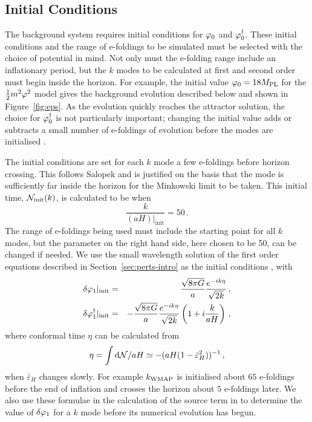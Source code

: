 \subsection{Initial Conditions} 
\label{sec:initconds-num}

The background system requires initial conditions for $\varphi_{0}$ and
$\varphi_{0}^{\dagger}$. These initial conditions and the range of
e-foldings to be simulated must be selected with the choice of
potential in mind. Not only must the
e-folding range include an inflationary period, but the $k$ modes to
be calculated at first and second order must begin inside the horizon. For example,
the initial value $\varphi_0 = 18M_{\mathrm{PL}}$ for the
$\frac{1}{2} m^2 \varphi^2$ model 
gives the background evolution described below and shown in Figure~\ref{fig:eps}. As
the evolution quickly reaches the attractor solution, the choice for $\varphi_0^{\dagger}$
is not particularly important; changing the initial value adds or subtracts a small
number of e-foldings of evolution before the modes are initialised
\cite{Ringeval:2007am, Martin:2006rs}.


The initial conditions are set for each $k$ mode a few e-foldings
before horizon crossing. This follows Salopek
\etal
\cite{Salopek:1988qh} and is justified on the basis that the mode is
sufficiently far inside the
horizon for the Minkowski limit to be taken. This initial time,
$\mathcal{N}_{\mathrm{init}}(k)$, is calculated to be when
%  
\begin{equation}
 \frac{k}{(aH)|_{\mathrm{init}}} = 50 \,.
\end{equation}
%
The range of e-foldings being used must include the starting point for
all $k$ modes, but the parameter on the right hand side, here chosen to
be 50, can be changed if needed.  We use the small wavelength solution
of the first order equations described in Section~\ref{sec:perts-intro} as the
initial conditions \cite{Salopek:1988qh}, with
%
\begin{eqnarray}
\label{eq:foics}
 \delta\varphi_{1}|_{\mathrm{init}} &=& \frac{\sqrt{8\pi G}}{a}
\frac{e^{-i k\eta}}{\sqrt{2k}} \,,\\
 \delta\varphi_{1}^{\dagger}|_{\mathrm{init}} &=& -\frac{\sqrt{8\pi G}}{a}
\frac{e^{-i k\eta}}{\sqrt{2k}} \left(1 + i \frac{k}{a H}\right) \,,
\end{eqnarray}
%
where conformal time $\eta$ can be calculated from 
% 
\begin{equation}
\label{eq:etacalc-num}
\eta=\int \mathrm{d}\mathcal{N}/aH \simeq
-(aH(1-\bar{\varepsilon}^2_H))^{-1}\,,
\end{equation} 
% 
when $\bar{\varepsilon}_H$ changes slowly. For
example $k_\mathrm{WMAP}$ is initialised
about $65$ e-foldings before the end of inflation and crosses the horizon about $5$ e-foldings
later.
We also use these formulae in the calculation of the source term in  to
determine the value of $\delta\varphi_{1}$ for a $k$ mode before its numerical evolution has
begun.


